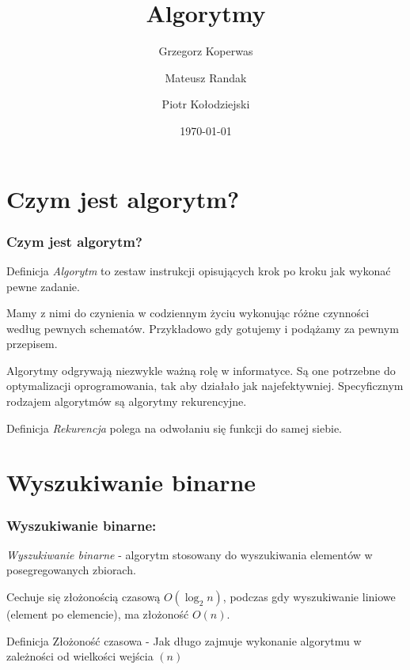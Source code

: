 \documentclass{beamer}
\title{Algorytmy}
\author{Grzegorz Koperwas \and Mateusz Randak \and Piotr Kołodziejski}
\date{\today}
\begin{document}
\begin{frame}
    \titlepage
\end{frame}

\section{Czym jest algorytm?}
\begin{frame}
    \frametitle{Czym jest algorytm?}
    \begin{block}{Definicja}
        \emph{Algorytm} to zestaw instrukcji opisujących krok po kroku jak wykonać pewne zadanie.
    \end{block}
    Mamy z nimi do czynienia w codziennym życiu wykonując różne czynności według pewnych schematów. Przykładowo gdy gotujemy i podążamy za pewnym przepisem.

    Algorytmy odgrywają niezwykle ważną rolę w informatyce. Są one potrzebne do optymalizacji oprogramowania, tak aby działało jak najefektywniej. Specyficznym rodzajem algorytmów są algorytmy rekurencyjne.

    \begin{block}{Definicja}
        \emph{Rekurencja} polega na odwołaniu się funkcji do samej siebie.
    \end{block}
\end{frame}

\section{Wyszukiwanie binarne}
\begin{frame}
    \frametitle{Wyszukiwanie binarne:}
    \emph{Wyszukiwanie binarne} - algorytm stosowany do wyszukiwania
    elementów w posegregowanych zbiorach.

    Cechuje się złożonością czasową $O \left(\log_2 n \right)$, podczas gdy wyszukiwanie liniowe (element po elemencie), ma złożoność $O \left( n \right)$.

    \begin{block}{Definicja}
        Złożoność czasowa - Jak długo zajmuje wykonanie algorytmu w zależności od wielkości wejścia $\left(n\right)$
    \end{block}
\end{frame}
\end{document}
